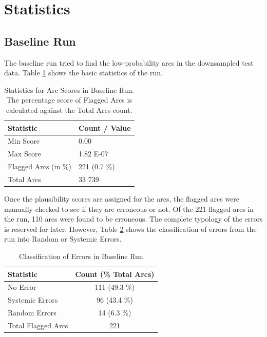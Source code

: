 \section{Statistics}
\label{baseline:lisca}

\subsection{Baseline Run}
\label{statistics:baseline}

The baseline run tried to find the low-probability arcs in the downsampled test data. Table \ref{tab:stats_baseline} shows the basic statistics of the run.

\begin{table}[H]
    \centering
    \begin{tabular}{|l|l|}
        \hline
        \textbf{Statistic} & \textbf{Count / Value} \\
        \hline
        Min Score & 0.00\\
        Max Score & 1.82 E-07\\
        Flagged Arcs (in \%) & 221 (0.7 \%)\\
        Total Arcs & 33 739\\
        \hline
    \end{tabular}
    \caption[Statistics for Arc Scores in Baseline Run]{Statistics for Arc Scores in Baseline Run. The percentage score of Flagged Arcs is calculated against the Total Arcs count.}
    \label{tab:stats_baseline}
\end{table}

Once the plausibility scores are assigned for the arcs, the flagged arcs were manually checked to see if they are erroneous or not. Of the 221 flagged arcs in the run, 110 arcs were found to be erroneous. The complete typology of the errors is reserved for later. However, Table \ref{tab:base_error_breakdown} shows the classification of errors from the run into Random or Systemic Errors.

\begin{table}[H]
    \centering
    \begin{tabular}{|l|c|}
        \hline
        \textbf{Statistic} & \textbf{Count (\% Total Arcs)}\\
        \hline
        No Error & 111 (49.3 \%)\\
        Systemic Errors & 96 (43.4 \%)\\
        Random Errors & 14 (6.3 \%)\\
        Total Flagged Arcs & 221\\
        \hline
    \end{tabular}
    \caption{Classification of Errors in Baseline Run}
    \label{tab:base_error_breakdown}
\end{table}


